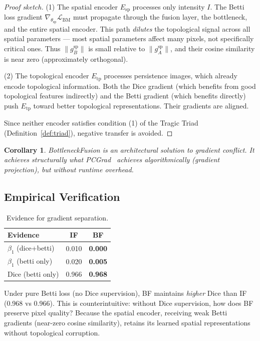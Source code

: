 \documentclass[10pt,twocolumn]{article}
\newtheorem{corollary}[definition]{Corollary}
\begin{document}
\begin{proof}[Proof sketch]
(1) The spatial encoder $E_{\text{sp}}$ processes only intensity $I$. The Betti loss gradient $\nabla_{\theta_{\text{sp}}} \mathcal{L}_{\text{BM}}$ must propagate through the fusion layer, the bottleneck, and the entire spatial encoder. This path \emph{dilutes} the topological signal across all spatial parameters --- most spatial parameters affect many pixels, not specifically critical ones. Thus $\|g_B^{\text{sp}}\|$ is small relative to $\|g_A^{\text{sp}}\|$, and their cosine similarity is near zero (approximately orthogonal).

(2) The topological encoder $E_{\text{tp}}$ processes persistence images, which already encode topological information. Both the Dice gradient (which benefits from good topological features indirectly) and the Betti gradient (which benefits directly) push $E_{\text{tp}}$ toward better topological representations. Their gradients are aligned.

Since neither encoder satisfies condition (1) of the Tragic Triad (Definition~\ref{def:triad}), negative transfer is avoided.
\end{proof}

\begin{corollary}
BottleneckFusion is an \emph{architectural} solution to gradient conflict. It achieves structurally what PCGrad~\cite{yu2020} achieves algorithmically (gradient projection), but without runtime overhead.
\end{corollary}

\subsection{Empirical Verification}

\begin{table}[H]
\centering
\caption{Evidence for gradient separation.}
\label{tab:evidence}
\begin{tabular}{lcc}
\toprule
\textbf{Evidence} & \textbf{IF} & \textbf{BF} \\
\midrule
$\beta_1$ (dice+betti) & 0.010 & \textbf{0.000} \\
$\beta_1$ (betti only) & 0.020 & \textbf{0.005} \\
Dice (betti only) & 0.966 & \textbf{0.968} \\
\bottomrule
\end{tabular}
\end{table}

Under pure Betti loss (no Dice supervision), BF maintains \emph{higher} Dice than IF (0.968 vs 0.966). This is counterintuitive: without Dice supervision, how does BF preserve pixel quality? Because the spatial encoder, receiving weak Betti gradients (near-zero cosine similarity), retains its learned spatial representations without topological corruption.
\end{document}
